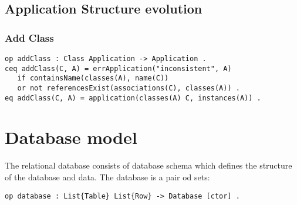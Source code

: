 \documentclass[11pt]{article}
\begin{document}
\subsection{Application Structure evolution}
\subsubsection{Add Class}
\begin{verbatim}
op addClass : Class Application -> Application .
ceq addClass(C, A) = errApplication("inconsistent", A) 
   if containsName(classes(A), name(C))  
   or not referencesExist(associations(C), classes(A)) .
eq addClass(C, A) = application(classes(A) C, instances(A)) .
\end{verbatim}


\section{Database model}
The relational database consists of database schema which defines the structure of the database and data. The database is a pair od sets:
\begin{verbatim}
op database : List{Table} List{Row} -> Database [ctor] .
\end{verbatim}
\end{document}

